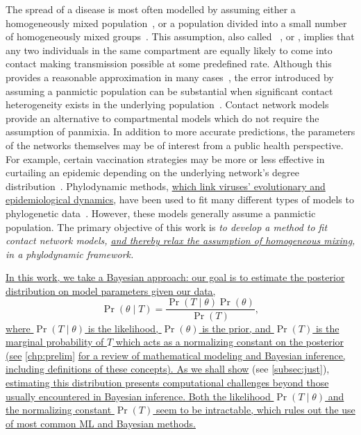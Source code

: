 \label{sec:obj}

The spread of a disease is most often modelled by assuming either a
homogeneously mixed population~\autocite{hamer1906milroy,
kermack1927contribution}, or a population divided into a small number of
homogeneously mixed groups~\autocite{rushton1955deterministic}. This
assumption, also called ~\autocite{heesterbeek2000mathematical}, or , implies
that any two individuals in the same compartment are equally likely to come
into contact making transmission possible at some predefined rate. Although
this provides a reasonable approximation in many
cases~\autocite{anderson1992infectious}, the error introduced by assuming a
panmictic population can be substantial when significant contact heterogeneity
exists in the underlying
population~\autocite{bansal2007individual,barthelemy2005dynamical,keeling2005networks}.
Contact network models provide an alternative to compartmental models which do
not require the assumption of panmixia. In addition to more accurate
predictions, the parameters of the networks themselves may be of interest from
a public health perspective. For example, certain vaccination strategies may be
more or less effective in curtailing an epidemic depending on the underlying
network's degree distribution~\autocite{peng2013vaccination, ma2013importance}.
Phylodynamic methods, {\color{blue}\uline{which link viruses' evolutionary and
epidemiological dynamics}}, have been used to fit many different types of models
to phylogenetic data~\autocite{pybus2009evolutionary,volz2013viral}. However,
these models generally assume a panmictic population. The primary objective of
this work is \emph{to develop a method to fit contact network models,
{\color{blue}\uline{and thereby relax the assumption of homogeneous mixing}},
in a phylodynamic framework.}

\newcommand{\G}{\mathcal{G}}
\newcommand{\Nu}{\mathcal{N}}

{\color{blue}\uline{In this work, we take a Bayesian approach: our goal is to
estimate the posterior distribution on model parameters given our data,}
\[
    \Pr(\theta \mid T) = \frac{\Pr(T \mid \theta) \Pr(\theta)}{\Pr(T)},
\]
\uline{where $\Pr(T \mid \theta)$ is the likelihood, $\Pr(\theta)$ is the prior,
and $\Pr(T)$ is the marginal probability of $T$ which acts as a normalizing
constant on the posterior (see} \cref{chp:prelim} \uline{for a review of
mathematical modeling and Bayesian inference, including definitions of these
concepts). As we shall show} (see \cref{subsec:just}), \uline{estimating this
distribution presents computational challenges beyond those usually encountered
in Bayesian inference. Both the likelihood $\Pr(T \mid \theta)$ and the
normalizing constant $\Pr(T)$ seem to be intractable, which rules out the use
of most common \acrlong{ML} and Bayesian methods. }}

